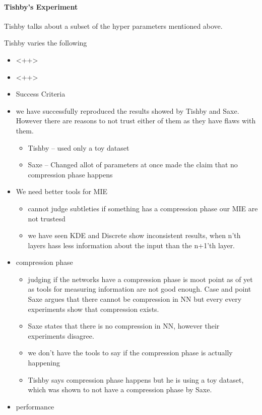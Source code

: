\documentclass[dissertation.tex]{subfiles}
\begin{document}
\paragraph{Tishby's Experiment} 

Tishby\cite{TISBHY} talks about a subset of the hyper parameters mentioned
above. 

Tishby varies the following 
\begin{itemize}
  \item{
      <++>
    }
  \item{
      <++>
    }
\end{itemize}


\begin{itemize}
  \item{
      Success Criteria
    }
  \item{
      we have successfully reproduced the results showed by Tishby and Saxe.
      However there are reasons to not trust either of them as they have flaws
      with them.
      \begin{itemize}
        \item{
            Tishby -- used only a toy dataset 
          }
        \item{
            Saxe -- Changed allot of parameters at once made the claim that no
            compression phase happens
          }
      \end{itemize}
    }
  \item{
      We need better tools for MIE
      \begin{itemize}
        \item{
            cannot judge subtleties if something has a compression phase our MIE
            are not trustesd
          }
        \item{
            we have seen KDE and Discrete show inconsistent results, when n'th
            layers hass less information about the input than the n+1'th layer.
          }
      \end{itemize}
    }
  \item{
      compression phase 
      \begin{itemize}
        \item{
            judging if the networks have a compression phase is moot point as of
            yet as tools for measuring information are not good enough. Case and
            point Saxe argues that there cannot be compression in NN but every
            every experiments show that compression exists.
          }
        \item{
            Saxe states that there is no compression in NN, however their
            experiments disagree. 
          }
        \item{
            we don't have the tools to say if the compression phase is actually
            happening
          }
        \item{
            Tishby says compression phase happens but he is using a toy dataset,
            which was shown to not have a compression phase by Saxe.
          }
      \end{itemize}
    }
  \item{
      performance
    }
\end{itemize}
\end{document}
